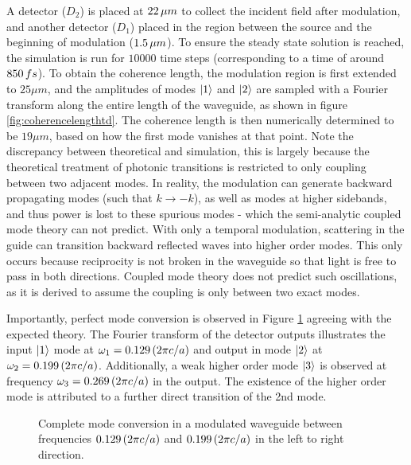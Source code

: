  A detector ($D_2$) is placed at $22 \mskip3mu \mu m$ to collect the incident field after modulation, and another detector ($D_1$) placed in the region between the source and the beginning of modulation ($1.5 \mskip3mu \mu m$). To ensure the steady state solution is reached, the simulation is run for $10 000$ time steps (corresponding to a time of around $850 \mskip3mu fs$). To obtain the coherence length, the modulation region is first extended to $25 \mu m$, and the amplitudes of modes $\ket{1}$ and $\ket{2}$ are sampled with a Fourier transform along the entire length of the waveguide, as shown in figure \ref{fig:coherencelengthtd}. The coherence length is then numerically determined to be $19 \mu m$, based on how the first mode vanishes at that point. Note the discrepancy between theoretical and simulation, this is largely because the theoretical treatment of photonic transitions is restricted to only coupling between two adjacent modes. In reality, the modulation can generate backward propagating modes (such that $k \rightarrow -k$), as well as modes at higher sidebands, and thus power is lost to these spurious modes - which the semi-analytic coupled mode theory can not predict. With only a temporal modulation, scattering in the guide can transition backward reflected waves into higher order modes. This only occurs because reciprocity is not broken in the waveguide so that light is free to pass in both directions. Coupled mode theory does not predict such oscillations, as it is derived to assume the coupling is only between two exact modes.

Importantly, perfect mode conversion is observed in Figure \ref{fig:reciprocalmode} agreeing with the expected theory. The Fourier transform of the detector outputs illustrates the input $\ket{1}$ mode at $\omega_1 = 0.129 \mskip3mu (2\pi c/a)$ and output in mode $\ket{2}$ at $\omega_2 = 0.199 \mskip3mu (2\pi c/a)$. Additionally, a weak higher order mode $\ket{3}$ is observed at frequency $\omega_3 = 0.269 \mskip3mu (2\pi c/a)$ in the output. The existence of the higher order mode is attributed to a further direct transition of the 2nd mode. 

\begin{figure}[t]
	\centering
	\setlength{\figH}{\textwidth}
	\setlength{\figW}{\textwidth}
	\begin{subfigure}[t]{\textwidth}
		\centering
		
	\end{subfigure}
	\begin{subfigure}[t]{\textwidth}
		\centering
	
	\end{subfigure}
	\caption[Complete mode conversion in a modulated waveguide]{Complete mode conversion in a modulated waveguide between frequencies $0.129 \mskip3mu (2\pi c/a)$ and $0.199 \mskip3mu (2 \pi c/a)$ in the left to right direction.}
	\label{fig:reciprocalmode}
\end{figure} 


